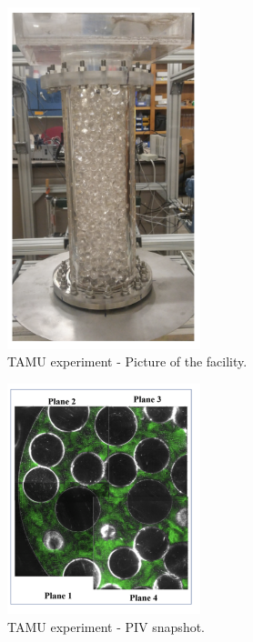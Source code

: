 \begin{figure}[!h]
\centering
\includegraphics[clip=true,width=0.5\textwidth]{Figures/pb_tamu1}
\caption{TAMU experiment - Picture of the facility. }
\label{f:tamu1}
\end{figure}

\begin{figure}[!h]
\centering
\includegraphics[clip=true,width=0.5\textwidth]{Figures/pb_tamu2}
\caption{TAMU experiment - PIV snapshot.}
\label{f:tamu2}
\end{figure}

